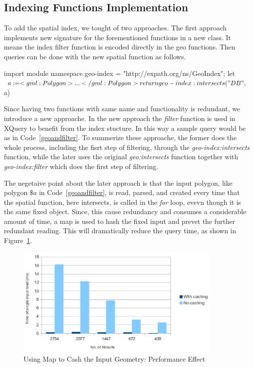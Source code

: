 \documentclass[a4paper,12pt]{article}
\begin{document}
\subsection{Indexing Functions Implementation}
\label{indexFunc}
To add the spatial index, we tought of two approaches. The first approach implements new signature for the forementioned functions in a new class. It means
the index filter function is encoded directly in the geo functions. Then queries can be done with the new spatial function as follows.
\begin{fakeXML}[label=salam,caption=My caption here]
import module namespace geo-index = "http://expath.org/ns/GeoIndex";
let $a:= <gml:Polygon> ... </gml:Polygon>
return geo-index:intersects("DB", $a) 
\end{fakeXML}

Since having two functions with same name and functionality is redundant, we introduce a new approache. In the new approach the \textit{filter} function is used in XQuery to benefit from the index stucture. In this way a sample query would be as in Code~\ref{geoandfilter}. To summerize these approache, the former does the whole process, including the fisrt step of filtering, through the \textit{geo-index:intersects} function, while the later uses the original \textit{geo:intersects} function together with \textit{geo-index:filter} which does the first step of filtering.  

The negetaive point about the later approach is that the input polygon, like polygon $\$a$ in Code~\ref{geoandfilter}, is read, parsed, and created every time that the spatial function, here intersects, is called in the \textit{for} loop, evevn though it is the same fixed object. Since, this cause redundancy and consumes a considerable amount of time, a map is used to hash the fixed input and prevet the further redundant reading. This will dramatically reduce the query time, as shown in Figure~\ref{figMap}.
 \begin{figure}
\centering
\includegraphics[width=0.9\textwidth]{MapIndexing}
\caption{Using Map to Cash the Input Geometry: Performance Effect}
\label{figMap}
\end{figure}
\end{document}
